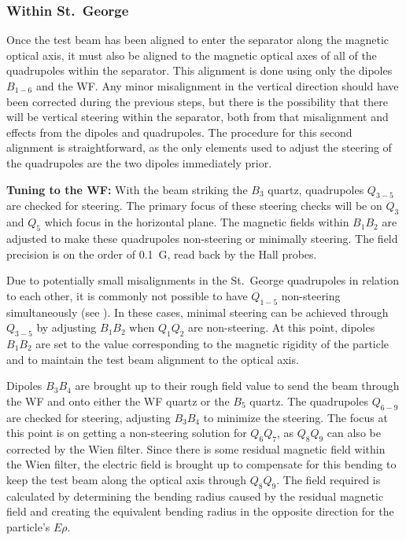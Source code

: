 \subsubsection{Within St.\ George}
\label{sec:tuning_stg}

Once the test beam has been aligned to enter the separator along the
magnetic optical axis, it must also be aligned to the magnetic optical
axes of all of the quadrupoles within the separator. This alignment is
done using only the dipoles $B_{1-6}$ and the WF. Any minor misalignment
in the vertical direction should have been corrected during the previous
steps, but there is the possibility that there will be vertical steering
within the separator, both from that misalignment and effects from the
dipoles and quadrupoles. The procedure for this second alignment is
straightforward, as the only elements used to adjust the steering of the
quadrupoles are the two dipoles immediately prior.


\textbf{Tuning to the WF:}
With the beam striking the $B_3$ quartz, quadrupoles $Q_{3-5}$ are
checked for steering. The primary focus of these steering checks will be
on $Q_3$ and $Q_5$ which focus in the horizontal plane. The magnetic
fields within $B_1B_2$ are adjusted to make these quadrupoles
non-steering or minimally steering. The field precision is on the order
of 0.1~G, read back by the Hall probes.

Due to potentially small misalignments in the St.\ George quadrupoles in
relation to each other, it is commonly not possible to have $Q_{1-5}$
non-steering simultaneously (see \cite{Meisel2017}). In these cases,
minimal steering can be achieved through $Q_{3-5}$ by adjusting $B_1B_2$
when $Q_1Q_2$ are non-steering. At this point, dipoles $B_1B_2$ are set
to the value corresponding to the magnetic rigidity of the particle and
to maintain the test beam alignment to the optical axis.

Dipoles $B_3B_4$ are brought up to their rough field value to send the
beam through the WF and onto either the WF quartz or the $B_5$ quartz.
The quadrupoles $Q_{6-9}$ are checked for steering, adjusting $B_3B_4$
to minimize the steering. The focus at this point is on getting a
non-steering solution for $Q_6Q_7$, as $Q_8Q_9$ can also be corrected by
the Wien filter. Since there is some residual magnetic field within the
Wien filter, the electric field is brought up to compensate for this
bending to keep the test beam along the optical axis through $Q_8Q_9$.
The field required is calculated by determining the bending radius
caused by the residual magnetic field and creating the equivalent
bending radius in the opposite direction for the particle's $E\rho$.

